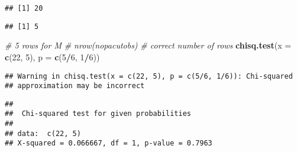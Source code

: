\documentclass[]{article}
\newenvironment{Shaded}{\begin{snugshade}}{\end{snugshade}}
\newcommand{\CommentTok}[1]{\textcolor[rgb]{0.56,0.35,0.01}{\textit{#1}}}
\newcommand{\DataTypeTok}[1]{\textcolor[rgb]{0.13,0.29,0.53}{#1}}
\newcommand{\DecValTok}[1]{\textcolor[rgb]{0.00,0.00,0.81}{#1}}
\newcommand{\KeywordTok}[1]{\textcolor[rgb]{0.13,0.29,0.53}{\textbf{#1}}}
\newcommand{\NormalTok}[1]{#1}
\newcommand{\OperatorTok}[1]{\textcolor[rgb]{0.81,0.36,0.00}{\textbf{#1}}}
\newcommand{\StringTok}[1]{\textcolor[rgb]{0.31,0.60,0.02}{#1}}
\begin{document}
\begin{Shaded}
\end{Shaded}

\begin{verbatim}
## [1] 20
\end{verbatim}

\begin{Shaded}
\end{Shaded}

\begin{verbatim}
## [1] 5
\end{verbatim}

\begin{Shaded}
\begin{Highlighting}[]
\CommentTok{# 5 rows for M}
\CommentTok{# nrow(nopacutobs)}
\CommentTok{# correct number of rows}
\KeywordTok{chisq.test}\NormalTok{(}\DataTypeTok{x =} \KeywordTok{c}\NormalTok{(}\DecValTok{22}\NormalTok{, }\DecValTok{5}\NormalTok{), }\DataTypeTok{p =} \KeywordTok{c}\NormalTok{(}\DecValTok{5}\OperatorTok{/}\DecValTok{6}\NormalTok{, }\DecValTok{1}\OperatorTok{/}\DecValTok{6}\NormalTok{))}
\end{Highlighting}
\end{Shaded}

\begin{verbatim}
## Warning in chisq.test(x = c(22, 5), p = c(5/6, 1/6)): Chi-squared
## approximation may be incorrect
\end{verbatim}

\begin{verbatim}
## 
##  Chi-squared test for given probabilities
## 
## data:  c(22, 5)
## X-squared = 0.066667, df = 1, p-value = 0.7963
\end{verbatim}
\end{document}
